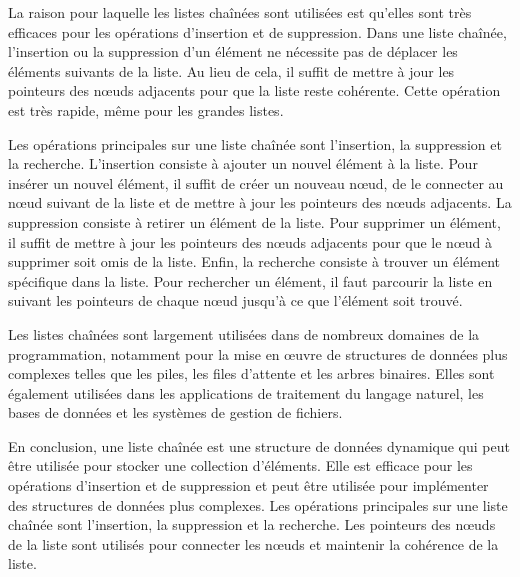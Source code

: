 \documentclass{article}
\begin{document}
            La raison pour laquelle les listes chaînées sont utilisées est qu'elles sont très efficaces pour les opérations d'insertion et de suppression. Dans une liste chaînée, l'insertion ou la suppression d'un élément ne nécessite pas de déplacer les éléments suivants de la liste. Au lieu de cela, il suffit de mettre à jour les pointeurs des nœuds adjacents pour que la liste reste cohérente. Cette opération est très rapide, même pour les grandes listes.

            Les opérations principales sur une liste chaînée sont l'insertion, la suppression et la recherche. L'insertion consiste à ajouter un nouvel élément à la liste. Pour insérer un nouvel élément, il suffit de créer un nouveau nœud, de le connecter au nœud suivant de la liste et de mettre à jour les pointeurs des nœuds adjacents. La suppression consiste à retirer un élément de la liste. Pour supprimer un élément, il suffit de mettre à jour les pointeurs des nœuds adjacents pour que le nœud à supprimer soit omis de la liste. Enfin, la recherche consiste à trouver un élément spécifique dans la liste. Pour rechercher un élément, il faut parcourir la liste en suivant les pointeurs de chaque nœud jusqu'à ce que l'élément soit trouvé.

            Les listes chaînées sont largement utilisées dans de nombreux domaines de la programmation, notamment pour la mise en œuvre de structures de données plus complexes telles que les piles, les files d'attente et les arbres binaires. Elles sont également utilisées dans les applications de traitement du langage naturel, les bases de données et les systèmes de gestion de fichiers.

            En conclusion, une liste chaînée est une structure de données dynamique qui peut être utilisée pour stocker une collection d'éléments. Elle est efficace pour les opérations d'insertion et de suppression et peut être utilisée pour implémenter des structures de données plus complexes. Les opérations principales sur une liste chaînée sont l'insertion, la suppression et la recherche. Les pointeurs des nœuds de la liste sont utilisés pour connecter les nœuds et maintenir la cohérence de la liste.
\end{document}
